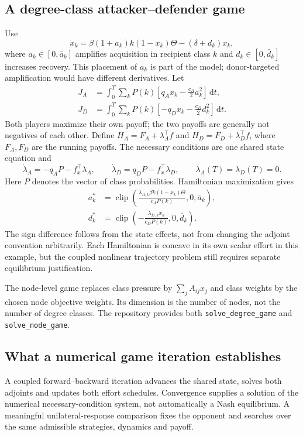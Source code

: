 \documentclass[11pt,a4paper]{article}
\newcommand{\dd}{\,\mathrm{d}}
\DeclareMathOperator{\clip}{clip}
\theoremstyle{definition}
\theoremstyle{remark}
\begin{document}
\subsection{A degree-class attacker--defender game}
Use
\begin{equation}
\dot x_k=\beta(1+a_k)k(1-x_k)\Theta-(\delta+d_k)x_k,
\end{equation}
where $a_k\in[0,\bar a_k]$ amplifies acquisition in recipient class $k$ and $d_k\in[0,\bar d_k]$ increases recovery. This placement of $a_k$ is part of the model; donor-targeted amplification would have different derivatives. Let
\begin{align}
J_A&=\int_0^T\sum_kP(k)\left[q_Ax_k-\frac{c_A}{2}a_k^2\right]\dd t,\nonumber\\
J_D&=\int_0^T\sum_kP(k)\left[-q_Dx_k-\frac{c_D}{2}d_k^2\right]\dd t.
\label{eq:game-payoffs}
\end{align}
Both players maximize their own payoff; the two payoffs are generally not negatives of each other. Define $H_A=F_A+\lambda_A^\top f$ and $H_D=F_D+\lambda_D^\top f$, where $F_A,F_D$ are the running payoffs. The necessary conditions are one shared state equation and
\begin{equation}
\dot\lambda_A=-q_AP-f_x^\top\lambda_A,\qquad
\dot\lambda_D=q_DP-f_x^\top\lambda_D,
\qquad \lambda_A(T)=\lambda_D(T)=0.
\end{equation}
Here $P$ denotes the vector of class probabilities. Hamiltonian maximization gives
\begin{align}
a_k^*&=\clip\left(\frac{\lambda_{A,k}\beta k(1-x_k)\Theta}{c_AP(k)},0,\bar a_k\right),\nonumber\\
d_k^*&=\clip\left(-\frac{\lambda_{D,k}x_k}{c_DP(k)},0,\bar d_k\right).
\label{eq:game-update}
\end{align}
The sign difference follows from the state effects, not from changing the adjoint convention arbitrarily. Each Hamiltonian is concave in its own scalar effort in this example, but the coupled nonlinear trajectory problem still requires separate equilibrium justification.

The node-level game replaces class pressure by $\sum_jA_{ij}x_j$ and class weights by the chosen node objective weights. Its dimension is the number of nodes, not the number of degree classes. The repository provides both \texttt{solve\_degree\_game} and \texttt{solve\_node\_game}.

\subsection{What a numerical game iteration establishes}
A coupled forward--backward iteration advances the shared state, solves both adjoints and updates both effort schedules. Convergence supplies a solution of the numerical necessary-condition system, not automatically a Nash equilibrium. A meaningful unilateral-response comparison fixes the opponent and searches over the same admissible strategies, dynamics and payoff.
\end{document}

